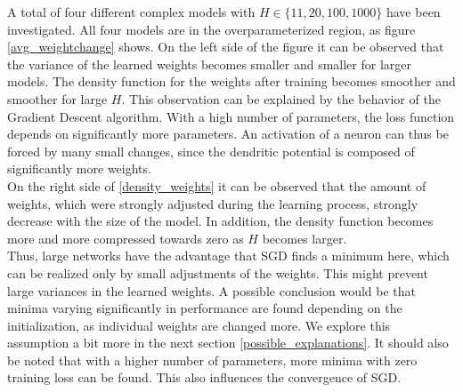 A total of four different complex models with $H \in \{11,20,100,1000\}$ have been investigated. All four models are in the overparameterized region, as figure \ref{avg_weightchange} shows. On the left side of the figure it can be observed that the variance of the learned weights becomes smaller and smaller for larger models.
The density function for the weights after training becomes smoother and smoother for large $H$. This observation can be explained by the behavior of the Gradient Descent algorithm. With a high number of parameters, the loss function depends on significantly more parameters. An activation of a neuron can thus be forced by many small changes, since the dendritic potential is composed of significantly more weights. \\
On the right side of \ref{density_weights} it can be observed that the amount of weights, which were strongly adjusted during the learning process, strongly decrease with the size of the model. In addition, the density function becomes more and more compressed towards zero as $H$ becomes larger. \\
Thus, large networks have the advantage that SGD finds a minimum here, which can be realized only by small adjustments of the weights. This might prevent large variances in the learned weights. A possible conclusion would be that minima varying significantly in performance are found depending on the initialization, as individual weights are changed more. We explore this assumption a bit more in the next section \ref{possible_explanations}. It should also be noted that with a higher number of parameters, more minima with zero training loss can be found. This also influences the convergence of SGD.  
\\








